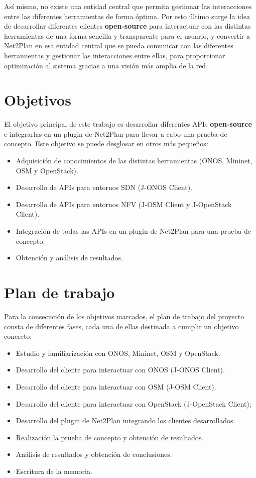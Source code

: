 Así mismo, no existe una entidad central que permita gestionar las interacciones entre las diferentes herramientas de forma óptima. Por esto último surge la idea de desarrollar diferentes clientes \textbf{open-source} para interactuar con las distintas herramientas de una forma sencilla y transparente para el usuario, y convertir a Net2Plan en esa entidad central que se pueda comunicar con las diferentes herramientas y gestionar las interacciones entre ellas, para proporcionar optimización al sistema gracias a una visión más amplia de la red.

\section{Objetivos}

El objetivo principal de este trabajo es desarrollar diferentes \acp{API} \textbf{open-source} e integrarlas en un plugin de Net2Plan para llevar a cabo una prueba de concepto. Este objetivo se puede desglosar en otros más pequeños:

\begin{itemize}
	\item Adquisición de conocimientos de las distintas herramientas (\ac{ONOS}, Mininet, \ac{OSM} y OpenStack). 
	\item Desarrollo de \acp{API} para entornos \ac{SDN} (J-ONOS Client).
	\item Desarrollo de \acp{API} para entornos \ac{NFV} (J-OSM Client y J-OpenStack Client).
	\item Integración de todas las \acp{API} en un plugin de Net2Plan para una prueba de concepto.
	\item Obtención y análisis de resultados.
\end{itemize}

\section{Plan de trabajo}

Para la consecución de los objetivos marcados, el plan de trabajo del proyecto consta de diferentes fases, cada una de ellas destinada a cumplir un objetivo concreto:

\begin{itemize}
	\item Estudio y familiarización con \ac{ONOS}, Mininet, \ac{OSM} y OpenStack.
	\item Desarrollo del cliente para interactuar con \ac{ONOS} (J-ONOS Client).
	\item Desarrollo del cliente para interactuar con \ac{OSM} (J-OSM Client).
	\item Desarrollo del cliente para interactuar con OpenStack (J-OpenStack Client);
	\item Desarrollo del plugin de Net2Plan integrando los clientes desarrollados.
	\item Realización la prueba de concepto y obtención de resultados.
	\item Análisis de resultados y obtención de conclusiones.
	\item Escritura de la memoria.
\end{itemize}


